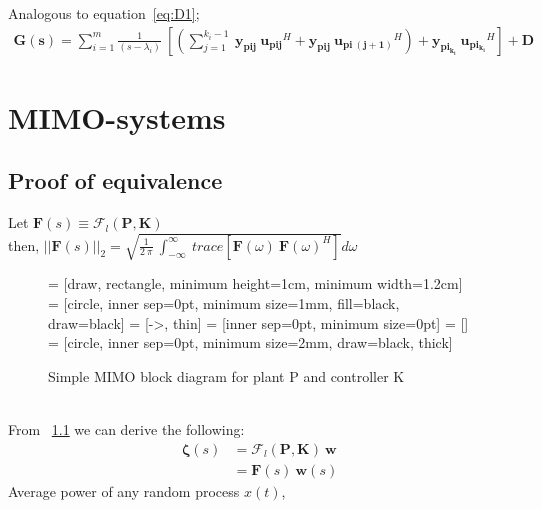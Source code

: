 \documentclass{scrreprt}
\begin{document}
Analogous to equation~\eqref{eq:D1};
\begin{align*}
\bm{G(s)} = \sum_{i=1}^m \frac{1}{(s - \lambda_i)}\:[(\sum_{j=1}^{k_i - 1}\: \bm{y_{pij}}\:\bm{u_{pij}}^H +  \bm{y_{pij}}\:\bm{u_{pi\:(j+1)}}^H) +  \bm{y_{pi_{k_i}}}\:\bm{u_{pi_{k_i}}}^H] + \bm{D}
\end{align*}

\chapter{MIMO-systems}

\section{Proof of equivalence}
Let $\bm{F}(s) \equiv \mathcal{F}_l(\bm{P},\bm{K})$ \\
then, $||\bm{F}(s)||_2 = \sqrt{\frac{1}{2\:\pi}\: \int_{-\infty}^{\infty}\: trace[\bm{F}(\omega)\:\bm{F}(\omega)^H]}d\omega$
\\
\begin{figure}[htb]
  \centering
       = [draw, rectangle, minimum height=1cm, minimum width=1.2cm]
        = [circle, inner sep=0pt, minimum size=1mm, fill=black, draw=black]
     = [->, thin]
         = [inner sep=0pt, minimum size=0pt]
         = []
           = [circle, inner sep=0pt, minimum size=2mm, draw=black, thick]
	  \caption{Simple MIMO block diagram for plant P and controller K}
    \label{fig:blockDiagram}
\end{figure} \\
From ~\ref{fig:blockDiagram} we can derive the following:
\begin{align*}
\bm{\zeta}(s) &= \mathcal{F}_l(\bm{P},\bm{K})\: \bm{w} \\
	&= \bm{F}(s)\:\bm{w}(s)
\end{align*}
Average power of any random process $x(t)$,
\end{document}

